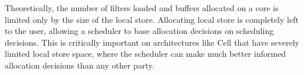 
Theoretically, the number of filters loaded and buffers allocated on a
core is limited only by the size of the local store.
Allocating local store is completely left to the user,
allowing a scheduler to base allocation decisions on scheduling decisions.
This is critically important on architectures like Cell that have
severely limited local store space, where the scheduler can make
much better informed allocation decisions than any other party.




